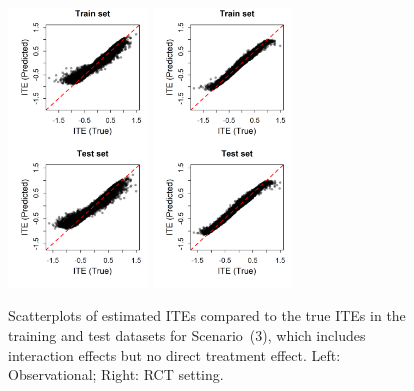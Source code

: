 \begin{figure}[htbp]
\centering
\includegraphics[width=0.33\textwidth]{img/results/observ_scenario3_ITE_scatter_train_test.png}
\includegraphics[width=0.33\textwidth]{img/results/rct_scenario3_ITE_scatter_train_test.png}
\vspace{-17pt}
\caption{Scatterplots of estimated ITEs compared to the true ITEs in the training and test datasets for Scenario~(3), which includes interaction effects but no direct treatment effect. Left: Observational; Right: RCT setting.}
\label{fig:scenario3_ite_scatter_train_test}
\end{figure}




